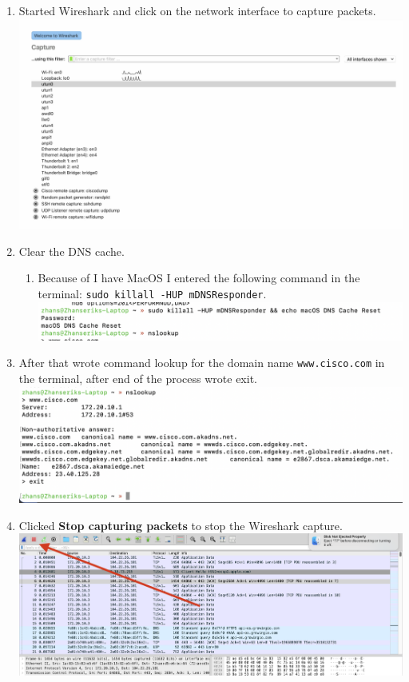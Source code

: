 \documentclass[12pt]{article}
\begin{document}
\begin{enumerate}
    \item Started Wireshark and click on the network interface to capture packets. \\
    \includegraphics[width=.7\textwidth]{Image5.png} \\
    \item Clear the DNS cache.
    \begin{enumerate}
        \item Because of I have MacOS I entered the following command in the terminal: \texttt{sudo killall -HUP mDNSResponder}. \\
        \includegraphics[width=.7\textwidth]{Image6.png} \\
    \end{enumerate}
    \item After that wrote command lookup for the domain name \texttt{www.cisco.com} in the terminal, after end of the process wrote exit. \\
    \includegraphics[width=.7\textwidth]{Image7.png} \\
    \item Clicked \textbf{Stop capturing packets} to stop the Wireshark capture. \\
    \includegraphics[width=.7\textwidth]{Image8.png} \\
\end{enumerate}
\end{document}
